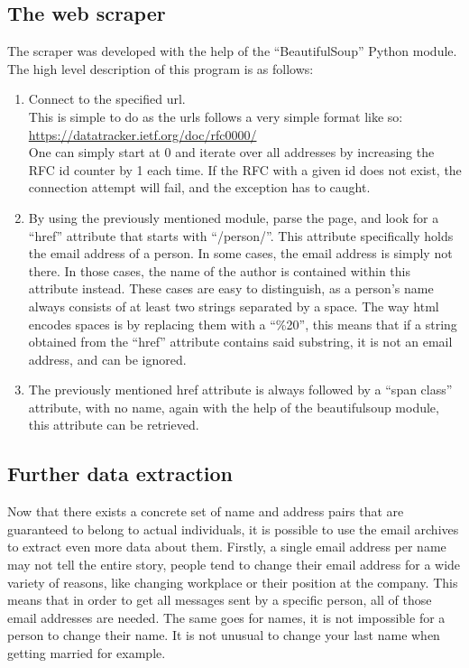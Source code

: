 \documentclass[a4paper,english]{report}
\begin{document}
\subsection{The web scraper}
The scraper was developed with the help of the “BeautifulSoup” Python module. The high level description of this program is as follows:

\begin{enumerate}

\item Connect to the specified url.\\
 This is simple to do as the urls follows a very simple format like so:\\
\url{https://datatracker.ietf.org/doc/rfc0000/}\\

One can simply start at 0 and iterate over all addresses by increasing the RFC id counter by 1 each time. If the RFC with a given id does not exist, the connection attempt will fail, and the exception has to caught. 



\item By using the previously mentioned module, parse the page, and look for a “href” attribute that starts with “/person/”. This attribute specifically holds the email address of a person. In some cases, the email address is simply not there. In those cases, the name of the author is contained within this attribute instead. These cases are easy to distinguish, as a person's name always consists of at least two strings separated by a space. The way html encodes spaces is by replacing them with a “\%20”, this means that if a string obtained from the “href” attribute contains said substring, it is not an email address, and can be ignored. 

\item The previously mentioned href attribute is always followed by a “span class” attribute, with no name, again with the help of the beautifulsoup module, this attribute can be retrieved.


\end{enumerate}

\subsection{Further data extraction}

Now that there exists a concrete set of name and address pairs that are guaranteed to belong to actual individuals, it is possible to use the email archives to extract even more data about them. 
Firstly, a single email address per name may not tell the entire story, people tend to change their email address for a wide variety of reasons, like changing workplace or their position at the company. This means that in order to get all messages sent by a specific person, all of those email addresses are needed.
The same goes for names, it is not impossible for a person to change their name. It is not unusual to change your last name when getting married for example.\\
\end{document}
